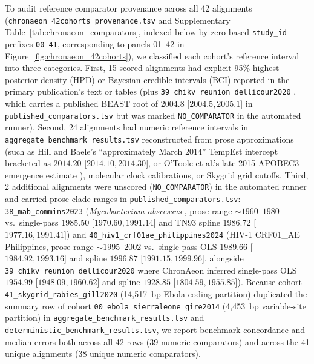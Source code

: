 \documentclass[11pt,letterpaper]{article}
\newcommand{\tool}[1]{\textsf{#1}}
\begin{document}
To audit reference comparator provenance across all 42 alignments (\nolinkurl{chronaeon_42cohorts_provenance.tsv} and Supplementary Table~\ref{tab:chronaeon_comparators}, indexed below by zero-based \texttt{study\_id} prefixes \texttt{00}--\texttt{41}, corresponding to panels 01--42 in Figure~\ref{fig:chronaeon_42cohorts}), we classified each cohort's reference interval into three categories. First, 15 scored alignments had explicit 95\% highest posterior density (HPD) or Bayesian credible intervals (BCI) reported in the primary publication's text or tables (plus \nolinkurl{39_chikv_reunion_dellicour2020} \cite{dellicour2020chikv}, which carries a published \tool{BEAST} root of $2004.8$ [$2004.5, 2005.1$] in \nolinkurl{published_comparators.tsv} but was marked \nolinkurl{NO_COMPARATOR} in the automated runner). Second, 24 alignments had numeric reference intervals in \nolinkurl{aggregate_benchmark_results.tsv} reconstructed from prose approximations (such as Hill and Baele's ``approximately March 2014'' \tool{TempEst} intercept \cite{hill2019skygrid} bracketed as $2014.20$ [$2014.10, 2014.30$], or O'Toole et al.'s late-2015 APOBEC3 emergence estimate \cite{otoole2023mpox}), molecular clock calibrations, or Skygrid grid cutoffs. Third, 2 additional alignments were unscored (\nolinkurl{NO_COMPARATOR}) in the automated runner and carried prose clade ranges in \nolinkurl{published_comparators.tsv}: \nolinkurl{38_mab_commins2023} (\textit{Mycobacterium abscessus} \cite{commins2023mab}, prose range $\sim 1960\text{--}1980$ vs.\ single-pass $1985.50$ [$1970.60, 1991.14$] and TN93 spline $1986.72$ [$1977.16, 1991.41$]) and \nolinkurl{40_hiv1_crf01ae_philippines2024} (HIV-1 CRF01\_AE Philippines, prose range $\sim 1995\text{--}2002$ vs.\ single-pass OLS $1989.66$ [$1984.92, 1993.16$] and spline $1996.87$ [$1991.15, 1999.96$], alongside \nolinkurl{39_chikv_reunion_dellicour2020} where \tool{ChronAeon} inferred single-pass OLS $1954.99$ [$1948.09, 1960.62$] and spline $1928.85$ [$1804.59, 1955.85$]). Because cohort \nolinkurl{41_skygrid_rabies_gill2020} (14,517~bp Ebola coding partition) duplicated the summary row of cohort \nolinkurl{00_ebola_sierraleone_gire2014} (4,453~bp variable-site partition) in \nolinkurl{aggregate_benchmark_results.tsv} and \nolinkurl{deterministic_benchmark_results.tsv}, we report benchmark concordance and median errors both across all 42 rows (39 numeric comparators) and across the 41 unique alignments (38 unique numeric comparators).
\end{document}
